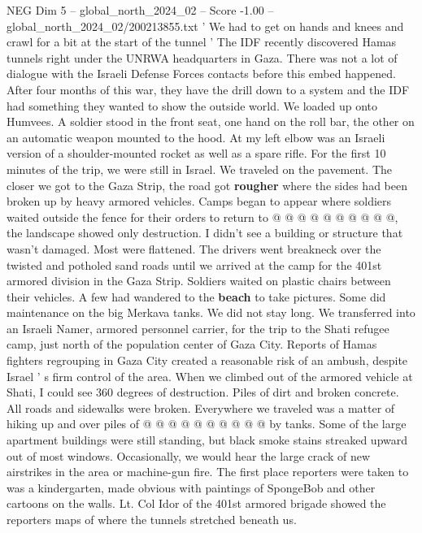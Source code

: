 \begin{textsample}{NEG Dim 5 – global\_north\_2024\_02 – Score -1.00 – global\_north\_2024\_02/200213855.txt}  \label{ex:f5_neg_210}
' We had to get on hands and knees and crawl for a bit at the start of the tunnel ' The IDF recently discovered Hamas tunnels right under the UNRWA headquarters in Gaza.
There was not a lot of dialogue with the Israeli Defense Forces contacts before this embed happened.
After four months of this war, they have the drill down to a system and the IDF had something they wanted to show the outside world.
We loaded up onto Humvees.
A soldier stood in the front seat, one hand on the roll bar, the other on an automatic weapon mounted to the hood.
At my left elbow was an Israeli version of a shoulder-mounted rocket as well as a spare rifle.
For the first 10 minutes of the trip, we were still in Israel.
We traveled on the pavement.
The closer we got to the Gaza Strip, the road got \textbf{rougher} where the sides had been broken up by heavy armored vehicles.
Camps began to appear where soldiers waited outside the fence for their orders to return to @ @ @ @ @ @ @ @ @ @, the landscape showed only destruction.
I didn't see a building or structure that wasn't damaged.
Most were flattened.
The drivers went breakneck over the twisted and potholed sand roads until we arrived at the camp for the 401st armored division in the Gaza Strip.
Soldiers waited on plastic chairs between their vehicles.
A few had wandered to the \textbf{beach} to take pictures.
Some did maintenance on the big Merkava tanks.
We did not stay long.
We transferred into an Israeli Namer, armored personnel carrier, for the trip to the Shati refugee camp, just north of the population center of Gaza City.
Reports of Hamas fighters regrouping in Gaza City created a reasonable risk of an ambush, despite Israel ' s firm control of the area.
When we climbed out of the armored vehicle at Shati, I could see 360 degrees of destruction.
Piles of dirt and broken concrete.
All roads and sidewalks were broken.
Everywhere we traveled was a matter of hiking up and over piles of @ @ @ @ @ @ @ @ @ @ by tanks.
Some of the large apartment buildings were still standing, but black smoke stains streaked upward out of most windows.
Occasionally, we would hear the large crack of new airstrikes in the area or machine-gun fire.
The first place reporters were taken to was a kindergarten, made obvious with paintings of SpongeBob and other cartoons on the walls.
Lt.
Col Idor of the 401st armored brigade showed the reporters maps of where the tunnels stretched beneath us.

\end{textsample}
